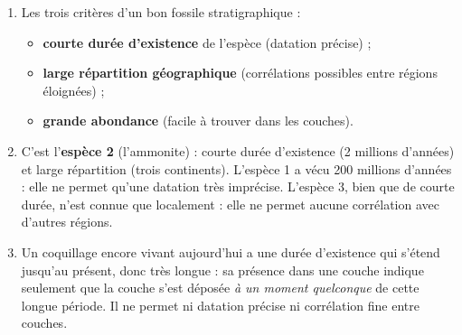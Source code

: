 \documentclass[11pt]{article}
\begin{document}
\begin{corrige}

\begin{enumerate}
\item Les trois critères d'un bon fossile stratigraphique :
\begin{itemize}
\item \textbf{courte durée d'existence} de l'espèce (datation précise) ;
\item \textbf{large répartition géographique} (corrélations possibles entre régions éloignées) ;
\item \textbf{grande abondance} (facile à trouver dans les couches).
\end{itemize}
\item C'est l'\textbf{espèce 2} (l'ammonite) : courte durée d'existence (2 millions d'années) et large répartition (trois continents). L'espèce 1 a vécu 200 millions d'années : elle ne permet qu'une datation très imprécise. L'espèce 3, bien que de courte durée, n'est connue que localement : elle ne permet aucune corrélation avec d'autres régions.
\item Un coquillage encore vivant aujourd'hui a une durée d'existence qui s'étend jusqu'au présent, donc très longue : sa présence dans une couche indique seulement que la couche s'est déposée \emph{à un moment quelconque} de cette longue période. Il ne permet ni datation précise ni corrélation fine entre couches.
\end{enumerate}
\end{corrige}
\end{document}
